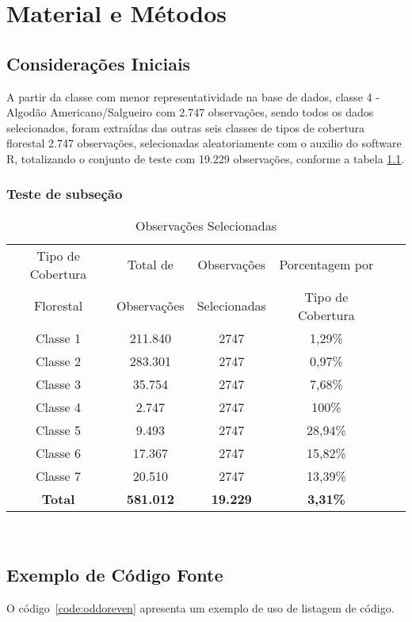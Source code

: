 \chapter{Material e Métodos}
\section {Considerações Iniciais}
A partir da classe com menor representatividade na base de dados, classe 4 - Algodão Americano/Salgueiro com 2.747 observações, sendo todos os dados selecionados, foram extraídas das outras seis classes de tipos de cobertura florestal 2.747 observações, selecionadas aleatoriamente com o auxilio do software R, totalizando o conjunto de teste com 19.229 observações, conforme a tabela \ref{tb:dados}.
\subsection[Teste de subseção]{ Teste de subseção}
\begin{table}[htbp]
\caption{Observações Selecionadas}
\label{tb:dados}
\centering
\setlength{\tabcolsep}{5pt}
\begin{tabular}{cccccc}
\hline
Tipo de Cobertura  &Total de  &Observações  &Porcentagem por \\
Florestal &Observações &Selecionadas &Tipo de Cobertura \\
\hline
Classe 1 &211.840 &2747 &1,29\% \\
Classe 2 &283.301 &2747 &0,97\% \\
Classe 3 &35.754  &2747 &7,68\% \\
Classe 4 &2.747   &2747 &100\% \\
Classe 5 &9.493   &2747 &28,94\% \\
Classe 6 &17.367  &2747 &15,82\% \\
Classe 7 &20.510  &2747 &13,39\% \\
\hline
\textbf{Total} &\textbf{581.012} &\textbf{19.229} &\textbf{3,31\%} \\
\hline
\end{tabular}
\\
\end{table}

\section{Exemplo de Código Fonte}
O código~\ref{code:oddoreven} apresenta um exemplo de uso de listagem de código.

